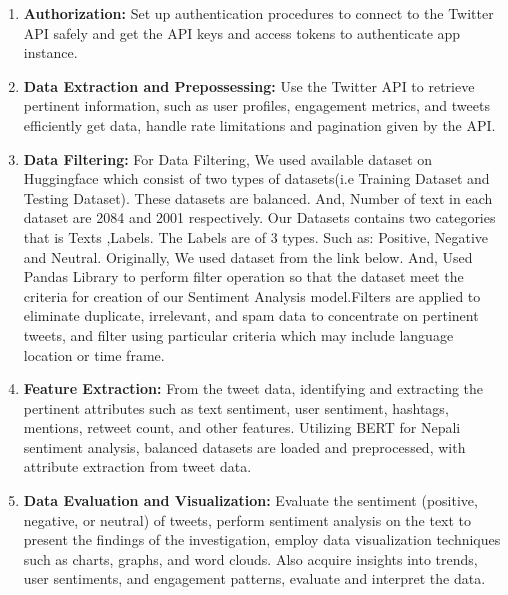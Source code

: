 \documentclass[a4paper,12pt]{article}
\begin{document}
{{{								
		\begin{enumerate}
			\item \textbf{Authorization:} Set up authentication procedures to connect to the Twitter API safely and get the API keys and access tokens to authenticate app instance.
			      			      			      			           
			\item \textbf{Data Extraction and Prepossessing:} Use the Twitter API to retrieve pertinent information, such as user profiles, engagement metrics, and tweets efficiently get data, handle rate limitations and pagination given by the API. 
			      			      			      			           
			\item \textbf{Data Filtering:} For Data Filtering, We used available dataset on Huggingface which consist of two 
types of datasets(i.e Training Dataset and Testing Dataset). These datasets are 
balanced. And, Number of text in each dataset are 2084 and 2001 respectively. Our 
Datasets contains two categories that is Texts ,Labels. The Labels are of 3 types. Such 
as: Positive, Negative and Neutral. Originally, We used dataset from the link below. And, 
Used Pandas Library to perform filter operation so that the dataset meet the criteria for 
creation of our Sentiment Analysis model.Filters are applied to eliminate duplicate, irrelevant, and spam data to concentrate on pertinent tweets, and filter using particular criteria which may include language location or time frame.
			      			      			      			      
			\item \textbf{Feature Extraction:} From the tweet data, identifying and extracting the pertinent attributes such as text sentiment, user sentiment, hashtags, mentions, retweet count, and other features. Utilizing BERT for Nepali sentiment analysis, balanced datasets are loaded and preprocessed, with attribute extraction from tweet data.
			      			      			      			      
			      
			\item \textbf{Data Evaluation and Visualization: }Evaluate the sentiment (positive, negative, or neutral) of tweets, perform sentiment analysis on the text to present the findings of the investigation, employ data visualization techniques such as charts, graphs, and word clouds. Also acquire insights into trends, user sentiments, and engagement patterns, evaluate and interpret the data.
			      			      			      	     

\end{enumerate}}}}
\end{document}
